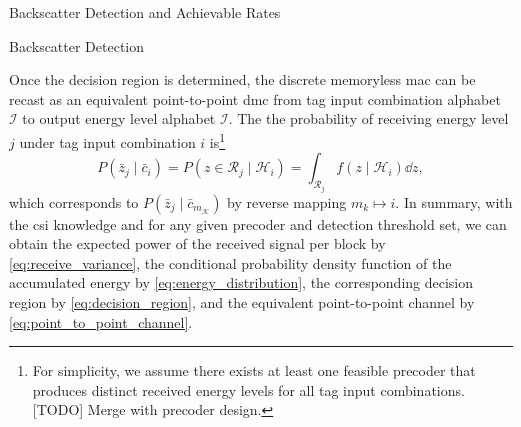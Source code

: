 \documentclass[journal]{IEEEtran}
\newtheorem{remark}{Remark}
\begin{document}
\begin{section}{Backscatter Detection and Achievable Rates}
\begin{subsection}{Backscatter Detection}

			Once the decision region is determined, the discrete memoryless \gls{mac} can be recast as an equivalent point-to-point \gls{dmc} from tag input combination alphabet $\mathcal{I}$ to output energy level alphabet $\mathcal{I}$. The the probability of receiving energy level $j$ under tag input combination $i$ is\footnote{For simplicity, we assume there exists at least one feasible precoder that produces distinct received energy levels for all tag input combinations. [TODO] Merge with precoder design.}
			\begin{equation}
				P(\bar{z}_j \mid \bar{c}_i) = P(z \in \mathcal{R}_j \mid \mathcal{H}_i) = \int_{\mathcal{R}_j} f(z \mid \mathcal{H}_i) \dd z,
				\label{eq:point_to_point_channel}
			\end{equation}
			which corresponds to $P(\bar{z}_j \mid \bar{c}_{m_{\mathcal{K}}})$ by reverse mapping $m_k \mapsto i$. In summary, with the \gls{csi} knowledge and for any given precoder and detection threshold set, we can obtain the expected power of the received signal per block by \eqref{eq:receive_variance}, the conditional probability density function of the accumulated energy by \eqref{eq:energy_distribution}, the corresponding decision region by \eqref{eq:decision_region}, and the equivalent point-to-point channel by \eqref{eq:point_to_point_channel}.
		\end{subsection}


\end{section}
\end{document}
